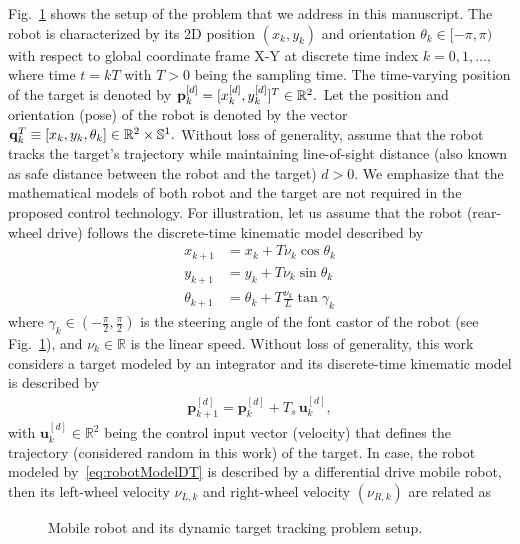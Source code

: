 \documentclass[conference]{IEEEtran}
\begin{document}
Fig.~\ref{fig:leaderFollowerSetup} shows the setup of the problem that we address in this manuscript. The robot is characterized by its 2D position $(x_k,y_k)$ and orientation $\theta_k\in[-\pi,\pi)$ with respect to global coordinate frame X-Y at discrete time index $k=0,1,\ldots,$ where time $t=kT$ with $T>0$ being the sampling time. The time-varying position of the target is denoted by ${\bf p}_k^{[d]}= [x_k^{[d]},y_k^{[d]}]^T\in\mathbb{R}^2.$  Let the position and orientation (pose) of the robot is denoted by the vector  ${\bf q}_k^T\equiv[x_k,y_k,\theta_k]\in\mathbb{R}^2\times\mathbb{S}^1.$ Without loss of generality, assume that the robot tracks the target's trajectory while maintaining line-of-sight distance (also known as safe distance between the robot and the target) $d>0.$ We emphasize that the mathematical models of both robot and the target are not required in the proposed control technology. For illustration, let us assume that the robot (rear-wheel drive) follows the discrete-time kinematic model described by %
%
\begin{subequations}
  \begin{align}
    \label{eq:robotModelDT}
    x_{k+1} &= x_k +T\nu_k\cos\theta_k\\
    y_{k+1} &= y_k +T\nu_k\sin\theta_k\\
    \theta_{k+1} &= \theta_k + T\frac{\nu_k}{L}\tan\gamma_k
  \end{align}
\end{subequations}
%
where $\gamma_k\in(-\frac{\pi}{2},\frac{\pi}{2})$ is the steering angle of the font castor of the robot (see Fig.~\ref{fig:leaderFollowerSetup}), and $\nu_k\in\mathbb{R}$ is the linear speed. Without loss of generality, this work considers a target modeled by an integrator and its discrete-time kinematic model is described by 
 \begin{align}
   \label{eq:leaderDT}
   \mathbf{p}_{k+1}^{[d]} = \mathbf{p}_k^{[d]} + T_s \, \mathbf{u}_k^{[d]},
 \end{align}  
with $\mathbf{u}_k^{[d]}\in\mathbb{R}^2$ being the control input vector (velocity) that defines the trajectory (considered random in this work) of the target.  In case, the robot modeled by~\eqref{eq:robotModelDT} is described by a differential drive mobile robot, then its left-wheel velocity $\nu_{L,k}$ and right-wheel velocity $(\nu_{R,k})$ are related as 
  \begin{figure}
   \centering
   \caption{Mobile robot and its dynamic target tracking problem setup.}
   \label{fig:leaderFollowerSetup}
 \end{figure}
\end{document}
